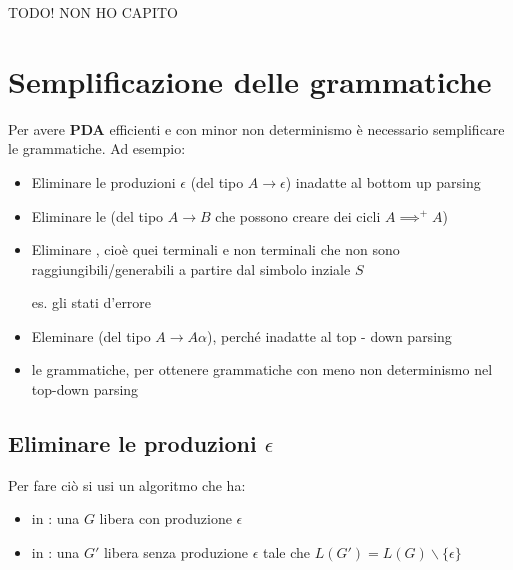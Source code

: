 TODO! NON HO CAPITO


\section{Semplificazione delle grammatiche}
Per avere \textbf{PDA} efficienti e con minor non determinismo è necessario semplificare le grammatiche. Ad esempio:
\begin{itemize}
    \item Eliminare le produzioni $\epsilon$ (del tipo $A\to\epsilon$) inadatte al bottom up parsing
    \item Eliminare le  (del tipo $A\to B$ che possono creare dei cicli $A \implies^+ A$) 
    \item Eliminare , cioè quei terminali e non terminali che non sono raggiungibili/generabili a partire dal simbolo inziale $S$
    
    es. gli stati d'errore 

    \item  Eleminare  (del tipo $A \to A\alpha$), perché inadatte al top - down parsing
    \item {} le grammatiche, per ottenere grammatiche con meno non determinismo nel top-down parsing
\end{itemize}

\subsection{Eliminare le produzioni $\epsilon$}
Per fare ciò si usi un algoritmo che ha:
\begin{itemize}
    \item in : una $G$ libera con produzione $\epsilon$ 
    \item in : una $G'$ libera senza produzione $\epsilon$ tale che $L(G') = L(G)\backslash\{\epsilon\}$ 
\end{itemize}

